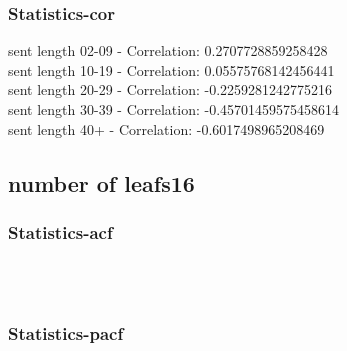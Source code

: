 \documentclass{article}%
\begin{document}
%
\newpage%
\subsubsection{Statistics{-}cor}%
\label{ssubsec:Statistics{-}cor}%
\noindent%
sent length 02-09 - Correlation: 0.2707728859258428\\%
sent length 10-19 - Correlation: 0.05575768142456441\\%
sent length 20-29 - Correlation: -0.2259281242775216\\%
sent length 30-39 - Correlation: -0.45701459575458614\\%
sent length 40+ - Correlation: -0.6017498965208469\\

%
\newpage

%
\subsection{number of leafs16}%
\label{subsec:numberofleafs16}%
\subsubsection{Statistics{-}acf}%
\label{ssubsec:Statistics{-}acf}%


\begin{figure}[ht]%
\centering%
\setlength{\abovecaptionskip}{-35pt}%
%
%
\\%
%
%
\\%
%
\end{figure}

%
\newpage%
\subsubsection{Statistics{-}pacf}%
\label{ssubsec:Statistics{-}pacf}%
\end{document}
